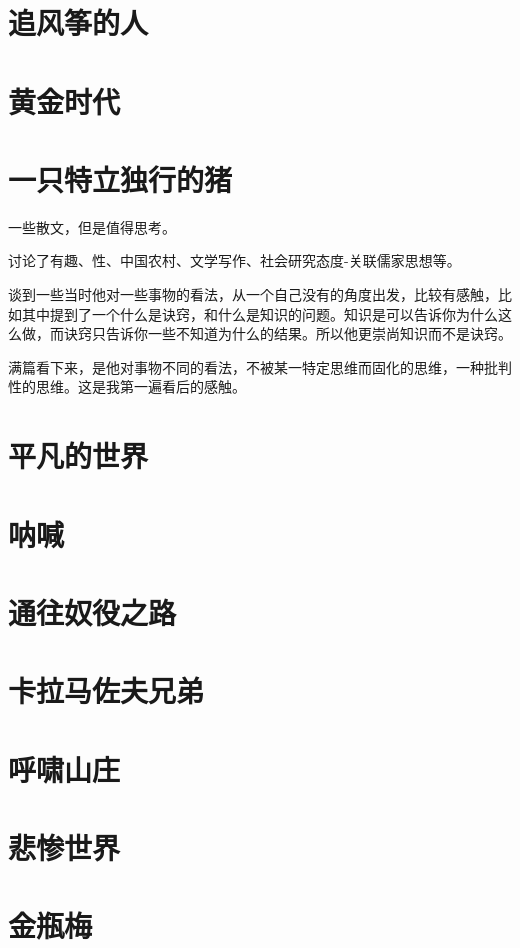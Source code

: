 \documentclass[UTF8,a4paper,12pt]{ctexbook}
\begin{document}
	\section{追风筝的人}
	
	\section{黄金时代}
	
	\section{一只特立独行的猪}
		一些散文，但是值得思考。
		
		讨论了有趣、性、中国农村、文学写作、社会研究态度-关联儒家思想等。
		
		谈到一些当时他对一些事物的看法，从一个自己没有的角度出发，比较有感触，比如其中提到了一个什么是诀窍，和什么是知识的问题。知识是可以告诉你为什么这么做，而诀窍只告诉你一些不知道为什么的结果。所以他更崇尚知识而不是诀窍。
		
		满篇看下来，是他对事物不同的看法，不被某一特定思维而固化的思维，一种批判性的思维。这是我第一遍看后的感触。
		
	\section{平凡的世界}
		
	\section{呐喊}
	
	\section{通往奴役之路}
	
	\section{卡拉马佐夫兄弟}
	
	\section{呼啸山庄}
	
	\section{悲惨世界}
	
	\section{金瓶梅}
	
\end{document}
